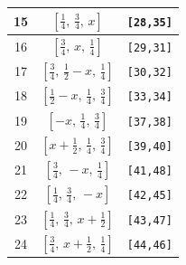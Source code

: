 \documentclass[fleqn,8pt]{jsarticle}
\begin{document}
\begin{longtable}{ccc}
15 & $\left[ \frac{1}{4},\, \frac{3}{4},\, x \right]$ & {\tt [28,35]} \\ \hline
16 & $\left[ \frac{3}{4},\, x,\, \frac{1}{4} \right]$ & {\tt [29,31]} \\ \hline
17 & $\left[ \frac{3}{4},\, \frac{1}{2} - x,\, \frac{1}{4} \right]$ & {\tt [30,32]} \\ \hline
18 & $\left[ \frac{1}{2} - x,\, \frac{1}{4},\, \frac{3}{4} \right]$ & {\tt [33,34]} \\ \hline
19 & $\left[ - x,\, \frac{1}{4},\, \frac{3}{4} \right]$ & {\tt [37,38]} \\ \hline
20 & $\left[ x + \frac{1}{2},\, \frac{1}{4},\, \frac{3}{4} \right]$ & {\tt [39,40]} \\ \hline
21 & $\left[ \frac{3}{4},\, - x,\, \frac{1}{4} \right]$ & {\tt [41,48]} \\ \hline
22 & $\left[ \frac{1}{4},\, \frac{3}{4},\, - x \right]$ & {\tt [42,45]} \\ \hline
23 & $\left[ \frac{1}{4},\, \frac{3}{4},\, x + \frac{1}{2} \right]$ & {\tt [43,47]} \\ \hline
24 & $\left[ \frac{3}{4},\, x + \frac{1}{2},\, \frac{1}{4} \right]$ & {\tt [44,46]} \\
\end{longtable}
\renewcommand{\arraystretch}{1.2}
\end{document}
